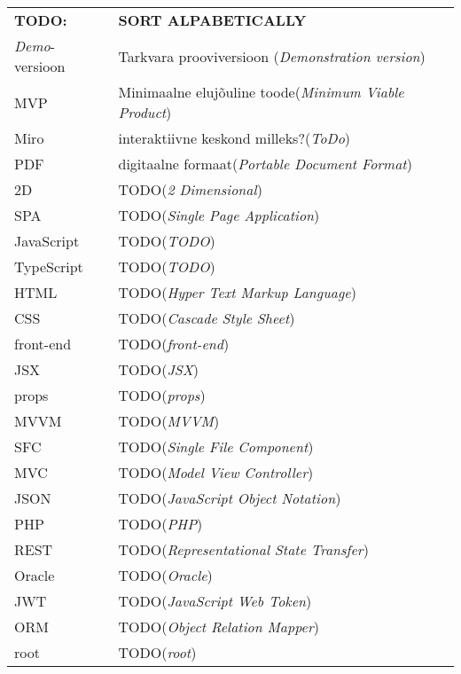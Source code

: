 \begin{longtable}{p{3cm}p{10cm}}
\textbf{TODO:}&\textbf{SORT ALPABETICALLY}\\
\textit{Demo}-versioon&Tarkvara prooviversioon (\emph{Demonstration version})\\
MVP&Minimaalne elujõuline toode(\emph{Minimum Viable Product})\\
Miro&interaktiivne keskond milleks?(\emph{ToDo})\\
PDF&digitaalne formaat(\emph{Portable Document Format})\\
2D&TODO(\emph{2 Dimensional})\\
SPA&TODO(\emph{Single Page Application})\\
JavaScript&TODO(\emph{TODO})\\
TypeScript&TODO(\emph{TODO})\\
HTML&TODO(\emph{Hyper Text Markup Language})\\
CSS&TODO(\emph{Cascade Style Sheet})\\
front-end&TODO(\emph{front-end})\\
JSX&TODO(\emph{JSX})\\
props&TODO(\emph{props})\\
MVVM&TODO(\emph{MVVM})\\
SFC&TODO(\emph{Single File Component})\\
MVC&TODO(\emph{Model View Controller})\\
JSON&TODO(\emph{JavaScript Object Notation})\\
PHP&TODO(\emph{PHP})\\
REST&TODO(\emph{Representational State Transfer})\\
Oracle&TODO(\emph{Oracle})\\
JWT&TODO(\emph{JavaScript Web Token})\\
ORM&TODO(\emph{Object Relation Mapper})\\
root&TODO(\emph{root})\\

\end{longtable}
\addtocounter{table}{-1} 